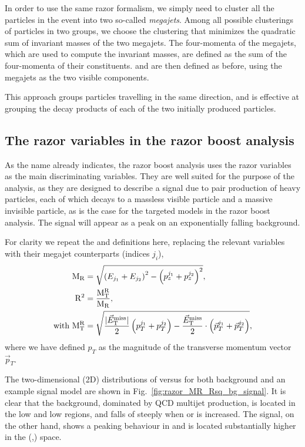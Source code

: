 In order to use the same razor formalism, we simply need to cluster all the particles in the event
into two so-called \textit{megajets}. Among all possible clusterings of particles in two groups, we
choose the clustering that minimizes the quadratic sum of invariant masses of the two megajets. The
four-momenta of the megajets, which are used to compute the invariant masses, are defined as the sum
of the four-momenta of their constituents. \mr and \rsq are then defined as before, using the
megajets as the two visible components. 

This approach groups particles travelling in the same direction, and is effective at grouping the
decay products of each of the two initially produced particles. 


\subsection{The razor variables in the razor boost analysis}

As the name already indicates, the razor boost analysis uses the razor variables as the main
discriminating variables. They are well suited for the purpose of the analysis, as they are
designed to describe a signal due to pair production of heavy particles, each of which decays to a
massless visible particle and a massive invisible particle, as is the case for the targeted models
in the razor boost analysis. The signal will appear as a peak on an exponentially falling
background. 

For clarity we repeat the \mr and \rsq definitions here, replacing the relevant variables with their
megajet counterparts (indices $j_i$), 
\begin{align}
  \mathrm{M_R} &= \sqrt{\left( E_{j_1} + E_{j_2}\right)^2 - \left( p_{z}^{j_1} + p_{z}^{j_2} \right)^2} ,\\
  \mathrm{R^2} &= \frac{\mathrm{M_T^R}}{\mathrm{M_R}} ,\\
  \textrm{with } \mathrm{M_T^R} &= \sqrt{\frac{|{\vec E}_{\mathrm{T}}^{\text{miss}}|}{2} \left(p^{j_1}_{T} + p^{j_2}_{T}
\right) - \frac{{\vec E}_{\mathrm{T}}^{\text{miss}}}{2} \cdot \left(\vec{p}^{j_1}_{T} + \vec{p}^{j_2}_{T} \right)} ,
\end{align}
where we have defined $p_T$ as the magnitude of the transverse momentum vector $\vec{p}_T$. 

The two-dimensional (2D) distributions of \rsq versus \mr for both background and an example signal
model are shown in Fig.~\ref{fig:razor_MR_Rsq_bg_signal}. It is clear that the background,
dominated by QCD multijet production, is located in the low \mr and low \rsq regions, and falls of
steeply when \mr or \rsq is increased. The signal, on the other hand, shows a peaking behaviour in
\mr and is located substantially higher in the (\mr,\rsq) space. 

